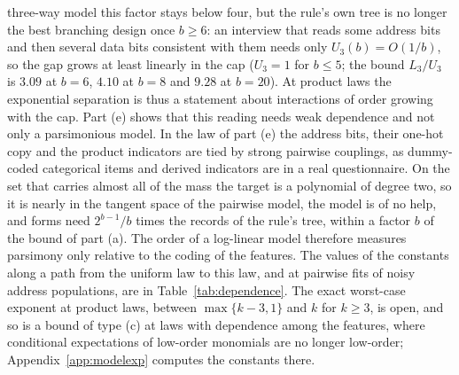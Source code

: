 three-way model this factor stays below four, but the rule's own tree is no
longer the best branching design once $b\ge6$: an interview that reads some
address bits and then several data bits consistent with them needs only
$U_3(b)=O(1/b)$, so the gap grows at least linearly in the cap ($U_3=1$ for
$b\le5$; the bound $L_3/U_3$ is $3.09$ at $b=6$, $4.10$ at $b=8$ and $9.28$ at
$b=20$). At product laws the exponential separation is thus a statement about
interactions of order growing with the cap. Part (e) shows that this reading
needs weak dependence and not only a parsimonious model. In the law of part
(e) the address bits, their one-hot copy and the product indicators are tied
by strong pairwise couplings, as dummy-coded categorical items and derived
indicators are in a real questionnaire. On the set that carries almost all of
the mass the target is a polynomial of degree two, so it is nearly in the
tangent space of the pairwise model, the model is of no help, and forms need $2^{b-1}/b$ times the records
of the rule's tree, within a factor $b$ of the bound of part (a). The order
of a log-linear model therefore measures parsimony only relative to the
coding of the features. The values of the constants along a path from the
uniform law to this law, and at pairwise fits of noisy address populations,
are in Table~\ref{tab:dependence}. The exact worst-case exponent at product laws,
between $\max\{k-3,1\}$ and $k$ for $k\ge3$, is open, and so is a bound of
type (c) at laws with dependence among the features, where conditional
expectations of low-order monomials are no longer low-order; Appendix~\ref{app:modelexp}
computes the constants there.

